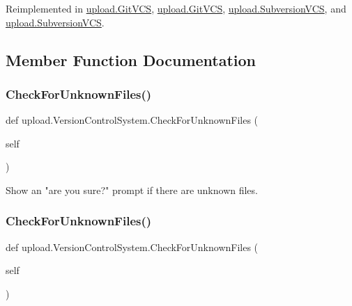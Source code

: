 Reimplemented in \mbox{\hyperlink{classupload_1_1_git_v_c_s_aba4e1dca1c4b3e5db7ba07f6bce3c839}{upload.\+Git\+V\+CS}}, \mbox{\hyperlink{classupload_1_1_git_v_c_s_aba4e1dca1c4b3e5db7ba07f6bce3c839}{upload.\+Git\+V\+CS}}, \mbox{\hyperlink{classupload_1_1_subversion_v_c_s_a8333f94e27335ce83eed0cc3f5a1eeb0}{upload.\+Subversion\+V\+CS}}, and \mbox{\hyperlink{classupload_1_1_subversion_v_c_s_a8333f94e27335ce83eed0cc3f5a1eeb0}{upload.\+Subversion\+V\+CS}}.



\subsection{Member Function Documentation}
\mbox{\label{classupload_1_1_version_control_system_ad2923d691a1b1047e9359c5b7c1c103f}} 
\subsubsection{\texorpdfstring{CheckForUnknownFiles()}{CheckForUnknownFiles()}\hspace{0.1cm}{\footnotesize\ttfamily [1/2]}}
{\footnotesize\ttfamily def upload.\+Version\+Control\+System.\+Check\+For\+Unknown\+Files (\begin{DoxyParamCaption}\item[{}]{self }\end{DoxyParamCaption})}

\begin{DoxyVerb}Show an "are you sure?" prompt if there are unknown files.\end{DoxyVerb}
 \mbox{\label{classupload_1_1_version_control_system_ad2923d691a1b1047e9359c5b7c1c103f}} 
\subsubsection{\texorpdfstring{CheckForUnknownFiles()}{CheckForUnknownFiles()}\hspace{0.1cm}{\footnotesize\ttfamily [2/2]}}
{\footnotesize\ttfamily def upload.\+Version\+Control\+System.\+Check\+For\+Unknown\+Files (\begin{DoxyParamCaption}\item[{}]{self }\end{DoxyParamCaption})}

